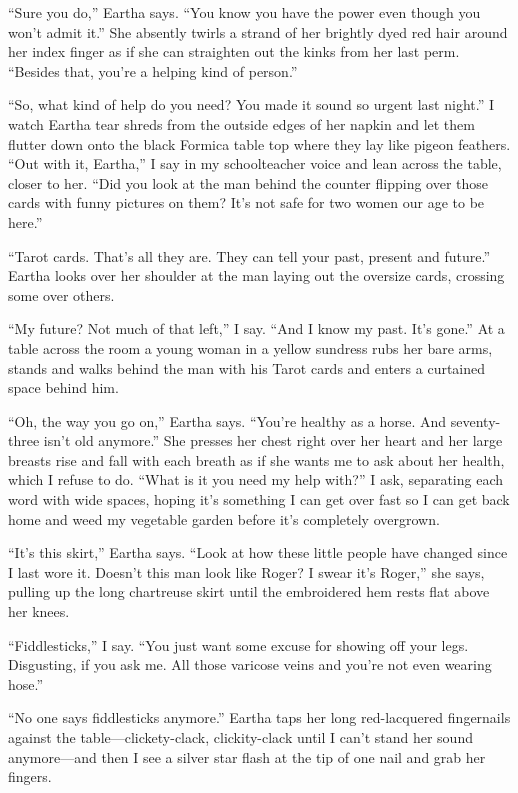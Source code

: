 \documentclass[twoside,10pt]{book}
\begin{document}
``Sure you do,'' Eartha says. ``You know you have the power even though
you won't admit it.'' She absently twirls a strand of her brightly dyed
red hair around her index finger as if she can straighten out the kinks
from her last perm. ``Besides that, you're a helping kind of person.''

``So, what kind of help do you need? You made it sound so urgent last
night.'' I watch Eartha tear shreds from the outside edges of her napkin
and let them flutter down onto the black Formica table top where they
lay like pigeon feathers. ``Out with it, Eartha,'' I say in my
schoolteacher voice and lean across the table, closer to her. ``Did you
look at the man behind the counter flipping over those cards with funny
pictures on them? It's not safe for two women our age to be here.''

``Tarot cards. That's all they are. They can tell your past, present and
future.'' Eartha looks over her shoulder at the man laying out the
oversize cards, crossing some over others.

``My future? Not much of that left,'' I say. ``And I know my past. It's
gone.'' At a table across the room a young woman in a yellow sundress
rubs her bare arms, stands and walks behind the man with his Tarot cards
and enters a curtained space behind him.

``Oh, the way you go on,'' Eartha says. ``You're healthy as a horse. And
seventy-three isn't old anymore.'' She presses her chest right over her
heart and her large breasts rise and fall with each breath as if she
wants me to ask about her health, which I refuse to do. ``What is it you
need my help with?'' I ask, separating each word with wide spaces,
hoping it's something I can get over fast so I can get back home and
weed my vegetable garden before it's completely overgrown.

``It's this skirt,'' Eartha says. ``Look at how these little people have
changed since I last wore it. Doesn't this man look like Roger? I swear
it's Roger,'' she says, pulling up the long chartreuse skirt until the
embroidered hem rests flat above her knees.

``Fiddlesticks,'' I say. ``You just want some excuse for showing off
your legs. Disgusting, if you ask me. All those varicose veins and
you're not even wearing hose.''

``No one says fiddlesticks anymore.'' Eartha taps her long red-lacquered
fingernails against the table---clickety-clack, clickity-clack until I
can't stand her sound anymore---and then I see a silver star flash at
the tip of one nail and grab her fingers.
\end{document}
